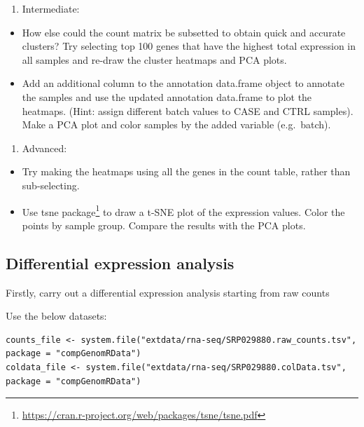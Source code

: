 \documentclass[12pt,]{krantz}
\providecommand{\tightlist}{%
  \setlength{\itemsep}{0pt}\setlength{\parskip}{0pt}}
\renewcommand{\href}[2]{#2\footnote{\url{#1}}}
\begin{document}
\begin{enumerate}
\def\labelenumi{\arabic{enumi}.}
\setcounter{enumi}{1}
\tightlist
\item
  Intermediate:
\end{enumerate}

\begin{itemize}
\tightlist
\item
  How else could the count matrix be subsetted to obtain quick and accurate clusters? Try selecting top 100 genes that have the highest total expression in all samples and re-draw the cluster heatmaps and PCA plots.
\item
  Add an additional column to the annotation data.frame object to annotate the samples and use the updated annotation data.frame to plot the heatmaps. (Hint: assign different batch values to CASE and CTRL samples). Make a PCA plot and color samples by the added variable (e.g.~batch).
\end{itemize}

\begin{enumerate}
\def\labelenumi{\arabic{enumi}.}
\setcounter{enumi}{2}
\tightlist
\item
  Advanced:
\end{enumerate}

\begin{itemize}
\tightlist
\item
  Try making the heatmaps using all the genes in the count table, rather than sub-selecting.
\item
  Use \href{https://cran.r-project.org/web/packages/tsne/tsne.pdf}{tsne package} to draw a t-SNE plot of the expression values. Color the points by sample group. Compare the results with the PCA plots.
\end{itemize}

\hypertarget{differential-expression-analysis-1}{%
\subsection{Differential expression analysis}\label{differential-expression-analysis-1}}

Firstly, carry out a differential expression analysis starting from raw counts

Use the below datasets:

\begin{verbatim}
counts_file <- system.file("extdata/rna-seq/SRP029880.raw_counts.tsv", package = "compGenomRData")
coldata_file <- system.file("extdata/rna-seq/SRP029880.colData.tsv", package = "compGenomRData")
\end{verbatim}
\end{document}
